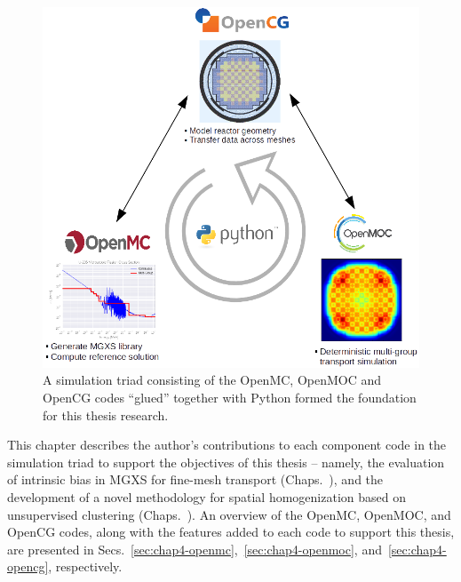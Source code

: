 \begin{figure}[h]
  \centering
  \includegraphics[width=\linewidth]{figures/workflow/triad/simulation-triad}
\caption[A simulation triad of OpenMC, OpenMOC and OpenCG]{A simulation triad consisting of the OpenMC, OpenMOC and OpenCG codes ``glued'' together with Python formed the foundation for this thesis research.}
\label{fig:chap4-simulation-triad}
\end{figure}

This chapter describes the author's contributions to each component code in the simulation triad to support the objectives of this thesis -- namely, the evaluation of intrinsic bias in \ac{MGXS} for fine-mesh transport (Chaps.~), and the development of a novel methodology for spatial homogenization based on unsupervised clustering (Chaps.~). An overview of the OpenMC, OpenMOC, and OpenCG codes, along with the features added to each code to support this thesis, are presented in Secs.~\ref{sec:chap4-openmc},~\ref{sec:chap4-openmoc}, and~\ref{sec:chap4-opencg}, respectively.


